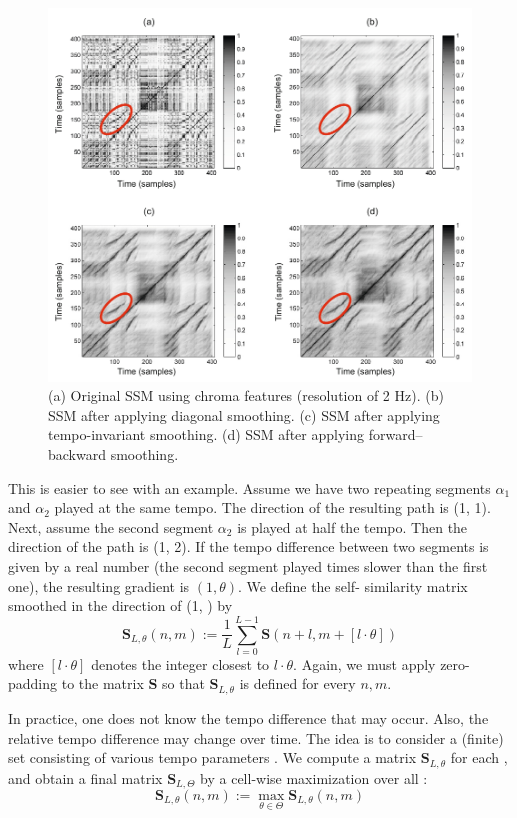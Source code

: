 \documentclass[a4paper, 9pt, twocolumn]{extarticle}
\begin{document}
\begin{figure}[h]
\centering
  \includegraphics[width=\linewidth]{images/ssmPathSmoothing.png}
\caption{(a) Original SSM using chroma features (resolution of 2 Hz). (b) SSM after applying diagonal smoothing. (c) SSM after applying tempo-invariant smoothing. (d) SSM after applying forward–backward smoothing.}
\label{fig:ssmPathSmoothing}
\end{figure}

This is easier to see with an example. Assume we have  two repeating segments $\alpha_{1}$ and $\alpha_{2}$ played at the same tempo. The direction of the resulting path is (1, 1). Next, assume the second segment $\alpha_{2}$ is played at half the tempo. Then the direction of the path is (1, 2). If the tempo difference between two segments is given by a real number  \theta (the second segment played \theta times slower than the first one), the resulting gradient is $(1,\theta)$. We define the self- similarity matrix smoothed in the direction of (1, \theta) by
\[\textbf{S}_{L,\theta}(n,m):=\frac{1}{L}\sum_{l=0}^{L-1}\textbf{S}(n+l,m+[l·\theta])\]
where $[l·\theta]$ denotes the integer closest to $l·\theta$. Again, we must apply zero-padding to the matrix $\textbf{S}$ so that $\textbf{S}_{L,\theta}$ is defined for every $n,m$.

In practice, one does not know the tempo difference that may occur.  Also, the relative tempo difference may change over time. The idea is to consider a (finite) set \Theta  consisting of various tempo parameters \theta. We compute a matrix $\textbf{S}_{L,\theta}$ for each \theta, and obtain a final matrix $\textbf{S}_{L,\Theta}$ by a cell-wise maximization over all \theta: 
\[\textbf{S}_{L,\theta}(n,m):=\max_{\theta\in\Theta}\textbf{S}_{L,\theta}(n,m)\]
\end{document}
